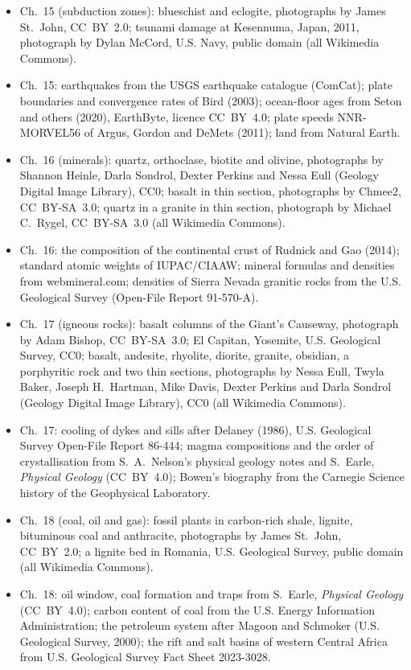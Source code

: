 \begin{itemize}
  \item Ch.~15 (subduction zones): blueschist and eclogite, photographs by James St.~John, CC~BY~2.0; tsunami damage at Kesennuma, Japan, 2011, photograph by Dylan McCord, U.S. Navy, public domain (all Wikimedia Commons).
  \item Ch.~15: earthquakes from the USGS earthquake catalogue (ComCat); plate boundaries and convergence rates of Bird (2003); ocean-floor ages from Seton and others (2020), EarthByte, licence CC~BY~4.0; plate speeds NNR-MORVEL56 of Argus, Gordon and DeMets (2011); land from Natural Earth.
  \item Ch.~16 (minerals): quartz, orthoclase, biotite and olivine, photographs by Shannon Heinle, Darla Sondrol, Dexter Perkins and Nessa Eull (Geology Digital Image Library), CC0; basalt in thin section, photographs by Chmee2, CC~BY-SA~3.0; quartz in a granite in thin section, photograph by Michael C.~Rygel, CC~BY-SA~3.0 (all Wikimedia Commons).
  \item Ch.~16: the composition of the continental crust of Rudnick and Gao (2014); standard atomic weights of IUPAC/CIAAW; mineral formulas and densities from webmineral.com; densities of Sierra Nevada granitic rocks from the U.S. Geological Survey (Open-File Report 91-570-A).
  \item Ch.~17 (igneous rocks): basalt columns of the Giant's Causeway, photograph by Adam Bishop, CC~BY-SA~3.0; El Capitan, Yosemite, U.S. Geological Survey, CC0; basalt, andesite, rhyolite, diorite, granite, obsidian, a porphyritic rock and two thin sections, photographs by Nessa Eull, Twyla Baker, Joseph H.~Hartman, Mike Davis, Dexter Perkins and Darla Sondrol (Geology Digital Image Library), CC0 (all Wikimedia Commons).
  \item Ch.~17: cooling of dykes and sills after Delaney (1986), U.S. Geological Survey Open-File Report 86-444; magma compositions and the order of crystallisation from S.~A.~Nelson's physical geology notes and S.~Earle, \emph{Physical Geology} (CC~BY~4.0); Bowen's biography from the Carnegie Science history of the Geophysical Laboratory.
  \item Ch.~18 (coal, oil and gas): fossil plants in carbon-rich shale, lignite, bituminous coal and anthracite, photographs by James St.~John, CC~BY~2.0; a lignite bed in Romania, U.S. Geological Survey, public domain (all Wikimedia Commons).
  \item Ch.~18: oil window, coal formation and traps from S.~Earle, \emph{Physical Geology} (CC~BY~4.0); carbon content of coal from the U.S. Energy Information Administration; the petroleum system after Magoon and Schmoker (U.S. Geological Survey, 2000); the rift and salt basins of western Central Africa from U.S. Geological Survey Fact Sheet 2023-3028.

\end{itemize}
